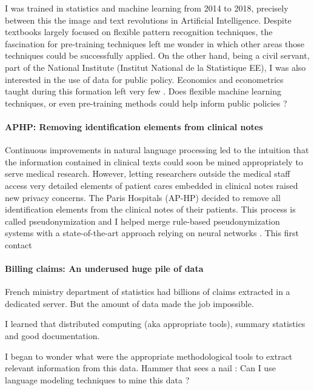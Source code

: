 \documentclass[french,12pt,twoside,a4paper]{book}
\begin{document}
I was trained in statistics and machine learning from 2014 to 2018, precisely
between this the image and text revolutions in Artificial Intelligence. Despite textbooks largely focused
on flexible pattern recognition techniques, the fascination for pre-training
techniques left me wonder in which other areas those techniques could be
successfully applied.
On the other hand, being a civil servant, part of the National Institute
(Institut National de la Statistique EE), I was also interested in the use of
data for public policy. Economics and econometrics taught during this formation
left very few . Does flexible machine learning techniques, or even pre-training
methods could help inform public policies ?
% 

%

\paragraph{APHP: Removing identification elements from clinical notes}

Continuous improvements in natural language processing led to the intuition that
the information contained in clinical texts could soon be mined appropriately to
serve medical research.
However, letting researchers outside the medical staff access very detailed
elements of patient cares embedded in clinical notes raised new privacy
concerns.
The Paris Hospitals (AP-HP) decided to remove all identification elements from
the clinical notes of their patients. This process is called pseudonymization
and I helped merge rule-based pseudonymization systems with a state-of-the-art
approach relying on neural networks \citep{dernoncourt2017identification,
  paris2019desidentification}.
This first contact

\paragraph{Billing claims: An underused huge pile of data}

French ministry department of statistics had billions of claims extracted in a
dedicated server. But the amount of data made the job impossible.

I learned that distributed computing (aka appropriate tools), summary statistics
and good documentation.

I began to wonder what were the appropriate methodological tools to extract
relevant information from this data. Hammer that sees a nail : Can I use language
modeling techniques to mine this data ?
\end{document}
